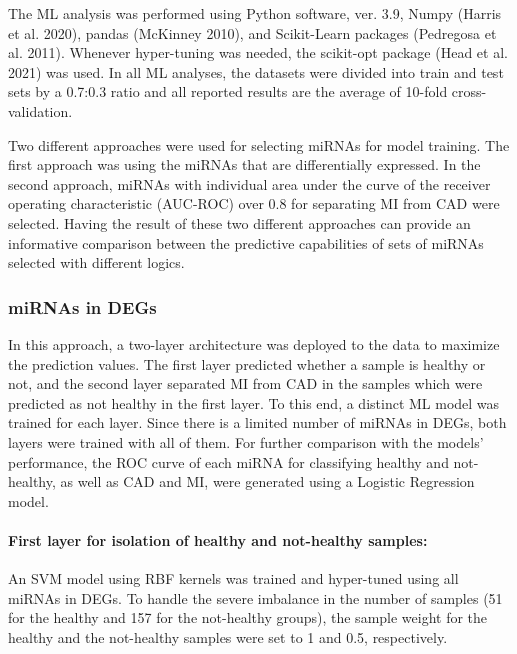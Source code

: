 \documentclass[smallextended]{svjour3}       %
\begin{document}
The ML analysis was performed using Python software, ver. 3.9, Numpy
(Harris et al. 2020), pandas (McKinney 2010), and Scikit-Learn packages
(Pedregosa et al. 2011). Whenever hyper-tuning was needed, the
scikit-opt package (Head et al. 2021) was used. In all ML analyses, the
datasets were divided into train and test sets by a 0.7:0.3 ratio and
all reported results are the average of 10-fold cross-validation.

Two different approaches were used for selecting miRNAs for model
training. The first approach was using the miRNAs that are
differentially expressed. In the second approach, miRNAs with individual
area under the curve of the receiver operating characteristic (AUC-ROC)
over 0.8 for separating MI from CAD were selected. Having the result of
these two different approaches can provide an informative comparison
between the predictive capabilities of sets of miRNAs selected with
different logics.

\hypertarget{mirnas-in-degs}{%
\subsubsection{miRNAs in DEGs}\label{mirnas-in-degs}}

In this approach, a two-layer architecture was deployed to the data to
maximize the prediction values. The first layer predicted whether a
sample is healthy or not, and the second layer separated MI from CAD in
the samples which were predicted as not healthy in the first layer. To
this end, a distinct ML model was trained for each layer. Since there is
a limited number of miRNAs in DEGs, both layers were trained with all of
them. For further comparison with the models' performance, the ROC curve
of each miRNA for classifying healthy and not-healthy, as well as CAD
and MI, were generated using a Logistic Regression model.

\hypertarget{first-layer-for-isolation-of-healthy-and-not-healthy-samples}{%
\paragraph{First layer for isolation of healthy and not-healthy
samples:}\label{first-layer-for-isolation-of-healthy-and-not-healthy-samples}}

An SVM model using RBF kernels was trained and hyper-tuned using all
miRNAs in DEGs. To handle the severe imbalance in the number of samples
(51 for the healthy and 157 for the not-healthy groups), the sample
weight for the healthy and the not-healthy samples were set to 1 and
0.5, respectively.
\end{document}
